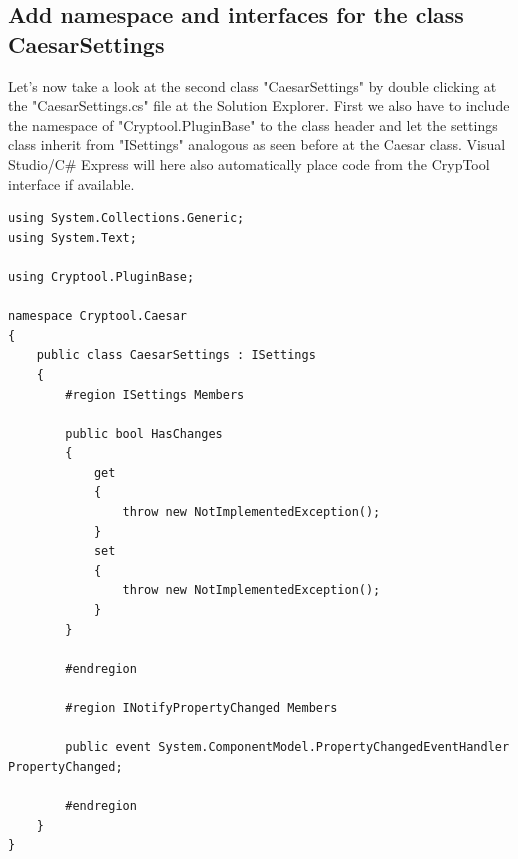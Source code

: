 \subsection{Add namespace and interfaces for the class CaesarSettings}\label{sec:AddNamespaceAndInterfacesForTheClassCaesarSettings}
Let's now take a look at the second class "CaesarSettings" by double clicking at the "CaesarSettings.cs" file at the Solution Explorer. First we also have to include the namespace of "Cryptool.PluginBase" to the class header and let the settings class inherit from "ISettings" analogous as seen before at the Caesar class. Visual Studio/C\# Express will here also automatically place code from the CrypTool interface if available.
\begin{lstlisting}
using System.Collections.Generic;
using System.Text;

using Cryptool.PluginBase;

namespace Cryptool.Caesar
{
    public class CaesarSettings : ISettings
    {
        #region ISettings Members

        public bool HasChanges
        {
            get
            {
                throw new NotImplementedException();
            }
            set
            {
                throw new NotImplementedException();
            }
        }

        #endregion

        #region INotifyPropertyChanged Members

        public event System.ComponentModel.PropertyChangedEventHandler PropertyChanged;

        #endregion
    }
}
\end{lstlisting}

